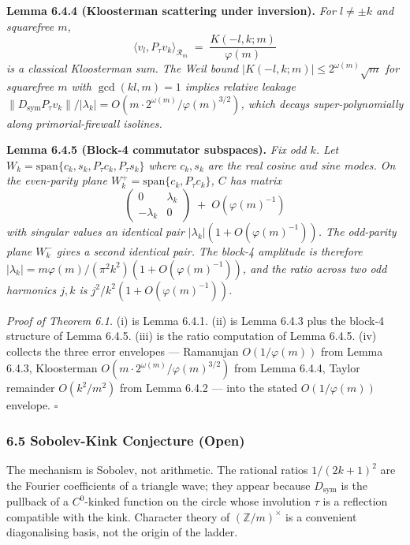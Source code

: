 \documentclass[
  11pt,
]{article}
\begin{document}
\textbf{Lemma 6.4.4 (Kloosterman scattering under inversion).} \emph{For
\(l \neq \pm k\) and squarefree \(m\),}
\[\langle v_l, P_\tau v_k\rangle_{\mathcal{R}_m} \;=\; \frac{K(-l, k; m)}{\varphi(m)} \tag{6.8}\]
\emph{is a classical Kloosterman sum. The Weil bound
\(|K(-l, k; m)| \leq 2^{\omega(m)}\sqrt m\) for squarefree \(m\) with
\(\gcd(kl, m) = 1\) implies relative leakage
\(\|D_\text{sym} P_\tau v_k\| / |\lambda_k| = O(m \cdot 2^{\omega(m)} / \varphi(m)^{3/2})\),
which decays super-polynomially along primorial-firewall isolines.}

\textbf{Lemma 6.4.5 (Block-4 commutator subspaces).} \emph{Fix odd
\(k\). Let \(W_k = \mathrm{span}\{c_k, s_k, P_\tau c_k, P_\tau s_k\}\)
where \(c_k, s_k\) are the real cosine and sine modes. On the
even-parity plane \(W_k^+ = \mathrm{span}\{c_k, P_\tau c_k\}\), \(C\)
has matrix}
\[\begin{pmatrix} 0 & \lambda_k \\ -\lambda_k & 0 \end{pmatrix} \;+\; O(\varphi(m)^{-1}) \tag{6.9}\]
\emph{with singular values an identical pair
\(|\lambda_k|(1 + O(\varphi(m)^{-1}))\). The odd-parity plane \(W_k^-\)
gives a second identical pair. The block-4 amplitude is therefore
\(|\lambda_k| = m\varphi(m)/(\pi^2 k^2)(1 + O(\varphi(m)^{-1}))\), and
the ratio across two odd harmonics \(j, k\) is
\(j^2/k^2(1 + O(\varphi(m)^{-1}))\).}

\emph{Proof of Theorem 6.1.} (i) is Lemma 6.4.1. (ii) is Lemma 6.4.3
plus the block-4 structure of Lemma 6.4.5. (iii) is the ratio
computation of Lemma 6.4.5. (iv) collects the three error envelopes ---
Ramanujan \(O(1/\varphi(m))\) from Lemma 6.4.3, Kloosterman
\(O(m \cdot 2^{\omega(m)}/\varphi(m)^{3/2})\) from Lemma 6.4.4, Taylor
remainder \(O(k^2/m^2)\) from Lemma 6.4.2 --- into the stated
\(O(1/\varphi(m))\) envelope. \(\square\)

\subsubsection{6.5 Sobolev-Kink Conjecture
(Open)}\label{sobolev-kink-conjecture-open}

The mechanism is Sobolev, not arithmetic. The rational ratios
\(1/(2k+1)^2\) are the Fourier coefficients of a triangle wave; they
appear because \(D_\text{sym}\) is the pullback of a \(C^0\)-kinked
function on the circle whose involution \(\tau\) is a reflection
compatible with the kink. Character theory of \((\mathbb{Z}/m)^\times\)
is a convenient diagonalising basis, not the origin of the ladder.
\end{document}
